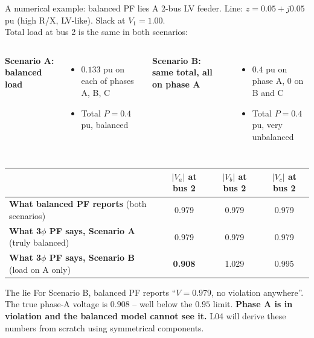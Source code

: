 \documentclass[aspectratio=169,10pt]{beamer}
\begin{document}
\begin{frame}{A numerical example: balanced PF lies}
A 2-bus LV feeder. Line: $z = 0.05 + j0.05$ pu (high R/X, LV-like). Slack at $V_1 = 1.00$.\\[0.3em]
Total load at bus 2 is the same in both scenarios:
\begin{columns}[T]
\textbf{Scenario A: balanced load}
\begin{itemize}
  \item $0.133$ pu on each of phases A, B, C
  \item Total $P = 0.4$ pu, balanced
\end{itemize}
\textbf{Scenario B: same total, all on phase A}
\begin{itemize}
  \item $0.4$ pu on phase A, $0$ on B and C
  \item Total $P = 0.4$ pu, very unbalanced
\end{itemize}
\end{columns}
\vspace{0.6em}
\centering
\small
\begin{tabular}{lccc}
\toprule
 & $|V_a|$ at bus 2 & $|V_b|$ at bus 2 & $|V_c|$ at bus 2 \\
\midrule
\textbf{What balanced PF reports} (both scenarios) & 0.979 & 0.979 & 0.979 \\
\textbf{What 3$\phi$ PF says, Scenario A} (truly balanced) & 0.979 & 0.979 & 0.979 \\
\textbf{What 3$\phi$ PF says, Scenario B} (load on A only) & \textbf{0.908} & 1.029 & 0.995 \\
\bottomrule
\end{tabular}
\vspace{0.5em}
\begin{alertblock}{The lie}
For Scenario B, balanced PF reports ``$V = 0.979$, no violation anywhere''. The true phase-A voltage is $0.908$ -- well below the $0.95$ limit. \textbf{Phase A is in violation and the balanced model cannot see it.} L04 will derive these numbers from scratch using symmetrical components.
\end{alertblock}
\end{frame}
\end{document}
